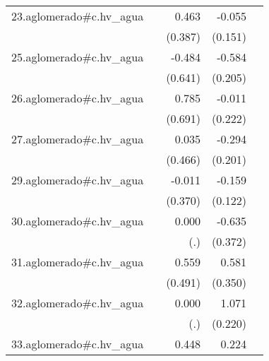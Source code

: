 {\begin{longtable}{l*{4}{D{.}{.}{-1}}}
\addlinespace
23.aglomerado#c.hv\_agua&                     &       0.463         &      -0.055         &                     \\
            &                     &     (0.387)         &     (0.151)         &                     \\
\addlinespace
25.aglomerado#c.hv\_agua&                     &      -0.484         &      -0.584\sym{**} &                     \\
            &                     &     (0.641)         &     (0.205)         &                     \\
\addlinespace
26.aglomerado#c.hv\_agua&                     &       0.785         &      -0.011         &                     \\
            &                     &     (0.691)         &     (0.222)         &                     \\
\addlinespace
27.aglomerado#c.hv\_agua&                     &       0.035         &      -0.294         &                     \\
            &                     &     (0.466)         &     (0.201)         &                     \\
\addlinespace
29.aglomerado#c.hv\_agua&                     &      -0.011         &      -0.159         &                     \\
            &                     &     (0.370)         &     (0.122)         &                     \\
\addlinespace
30.aglomerado#c.hv\_agua&                     &       0.000         &      -0.635         &                     \\
            &                     &         (.)         &     (0.372)         &                     \\
\addlinespace
31.aglomerado#c.hv\_agua&                     &       0.559         &       0.581         &                     \\
            &                     &     (0.491)         &     (0.350)         &                     \\
\addlinespace
32.aglomerado#c.hv\_agua&                     &       0.000         &       1.071\sym{***}&                     \\
            &                     &         (.)         &     (0.220)         &                     \\
\addlinespace
33.aglomerado#c.hv\_agua&                     &       0.448         &       0.224\sym{**} &                     \\

\end{longtable}}
